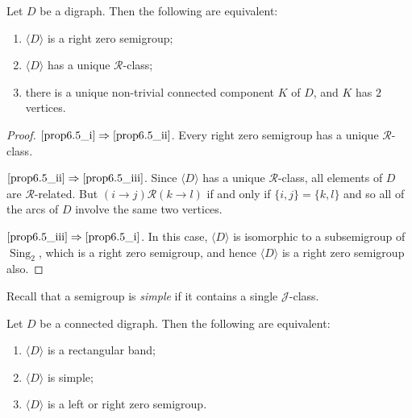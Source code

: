 \documentclass[ALCO,ThmDefs,Unicode,epreuves]{cedram}
\DeclareMathOperator{\Sing}{Sing}
\newcommand{\genset}[1]{\langle#1\rangle}
\newcommand{\R}{\mathcal{R}}
\newcommand{\J}{\mathcal{J}}
\begin{document}
\begin{proposition}\label{prop-right-zeros}
 Let $D$ be a digraph. Then the following are equivalent:
 
 \begin{enumerate}[(\roman*)]
 \item\label{prop6.5_i}
 $\genset{D}$ is a right zero semigroup;

 \item\label{prop6.5_ii}
 $\genset{D}$ has a unique $\R$-class;

 \item\label{prop6.5_iii}
 there is a unique non-trivial connected component $K$ of $D$, and $K$ has
 $2$ vertices.
 \end{enumerate}
\end{proposition}
\begin{proof}
 $\ref{prop6.5_i}\Rightarrow\ref{prop6.5_ii}$. Every right zero semigroup has a unique
 $\R$-class.

 $\ref{prop6.5_ii}\Rightarrow\ref{prop6.5_iii}$. 
 Since $\genset{D}$ has a unique $\R$-class, all elements of $D$ are
 $\R$-related. But $(i\to j)\R(k\to l)$ if and only if $\{i,j\}=\{k,l\}$
 and so all of the arcs of $D$ involve the same two vertices. 
 
 $\ref{prop6.5_iii}\Rightarrow\ref{prop6.5_i}$.
 In this case, $\genset{D}$ is isomorphic to a subsemigroup of $\Sing_2$,
 which is a right zero semigroup, and hence $\genset{D}$ is a right zero
 semigroup also.
\end{proof}

Recall that a semigroup is \emph{simple} if it contains a single $\J$-class.

\begin{proposition}
 Let $D$ be a connected digraph. Then the following are equivalent: 
 
 \begin{enumerate}[(\roman*)]
 \item\label{prop6.6_i}
 $\genset{D}$ is a rectangular band;

 \item\label{prop6.6_ii}
 $\genset{D}$ is simple;

 \item\label{prop6.6_iii}
 $\genset{D}$ is a left or right zero semigroup.
 \end{enumerate}
\end{proposition}
\end{document}
